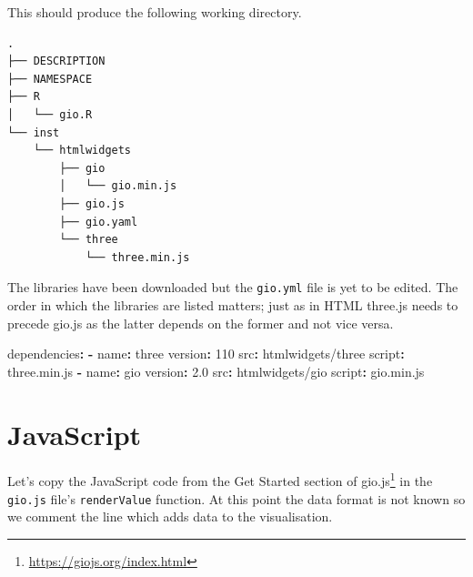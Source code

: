 \documentclass[
]{krantz}
\makeatletter
\newenvironment{Shaded}{\begin{snugshade}}{\end{snugshade}}
\newcommand{\AttributeTok}[1]{\textcolor[rgb]{0.61,0.61,0.61}{#1}}
\newcommand{\DecValTok}[1]{\textcolor[rgb]{0.06,0.06,0.06}{#1}}
\newcommand{\FloatTok}[1]{\textcolor[rgb]{0.06,0.06,0.06}{#1}}
\newcommand{\FunctionTok}[1]{\textcolor[rgb]{0,0,0}{#1}}
\newcommand{\KeywordTok}[1]{\textcolor[rgb]{0.27,0.27,0.27}{\textbf{#1}}}
\renewcommand{\href}[2]{#2\footnote{\url{#1}}}
\newenvironment{kframe}{%
\medskip{}
\setlength{\fboxsep}{.8em}
 \def\at@end@of@kframe{}%
 \ifinner\ifhmode%
  \def\at@end@of@kframe{\end{minipage}}%
  \begin{minipage}{\columnwidth}%
 \fi\fi%
 \def\FrameCommand##1{\hskip\@totalleftmargin \hskip-\fboxsep
 \colorbox{shadecolor}{##1}\hskip-\fboxsep
     \hskip-\linewidth \hskip-\@totalleftmargin \hskip\columnwidth}%
 \MakeFramed {\advance\hsize-\width
   \@totalleftmargin\z@ \linewidth\hsize
   \@setminipage}}%
 {\par\unskip\endMakeFramed%
 \at@end@of@kframe}
\renewenvironment{Shaded}{\begin{kframe}}{\end{kframe}}
\makeatother
\begin{document}
This should produce the following working directory.

\begin{verbatim}
.
├── DESCRIPTION
├── NAMESPACE
├── R
│   └── gio.R
└── inst
    └── htmlwidgets
        ├── gio
        │   └── gio.min.js
        ├── gio.js
        ├── gio.yaml
        └── three
            └── three.min.js
\end{verbatim}

The libraries have been downloaded but the \texttt{gio.yml} file is yet to be edited. The order in which the libraries are listed matters; just as in HTML three.js needs to precede gio.js as the latter depends on the former and not vice versa.

\begin{Shaded}
\begin{Highlighting}[]
\FunctionTok{dependencies}\KeywordTok{:}
\AttributeTok{  }\KeywordTok{{-}}\AttributeTok{ }\FunctionTok{name}\KeywordTok{:}\AttributeTok{ three}
\AttributeTok{    }\FunctionTok{version}\KeywordTok{:}\AttributeTok{ }\DecValTok{110}
\AttributeTok{    }\FunctionTok{src}\KeywordTok{:}\AttributeTok{ htmlwidgets/three}
\AttributeTok{    }\FunctionTok{script}\KeywordTok{:}\AttributeTok{ three.min.js}
\AttributeTok{  }\KeywordTok{{-}}\AttributeTok{ }\FunctionTok{name}\KeywordTok{:}\AttributeTok{ gio}
\AttributeTok{    }\FunctionTok{version}\KeywordTok{:}\AttributeTok{ }\FloatTok{2.0}
\AttributeTok{    }\FunctionTok{src}\KeywordTok{:}\AttributeTok{ htmlwidgets/gio}
\AttributeTok{    }\FunctionTok{script}\KeywordTok{:}\AttributeTok{ gio.min.js}
\end{Highlighting}
\end{Shaded}

\hypertarget{javascript-2}{%
\section*{JavaScript}\label{javascript-2}}


Let's copy the JavaScript code from the \href{https://giojs.org/index.html}{Get Started section of gio.js} in the \texttt{gio.js} file's \texttt{renderValue} function. At this point the data format is not known so we comment the line which adds data to the visualisation.
\end{document}

